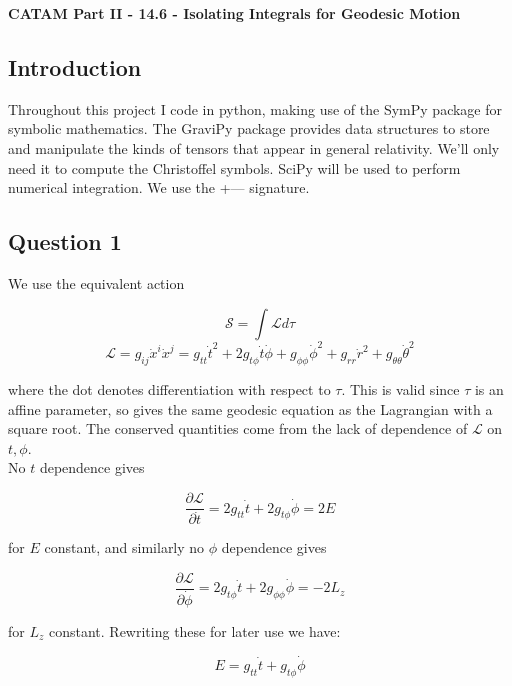 \documentclass[10pt,a4paper]{report}
\begin{document}
\textbf{CATAM Part II - 14.6 - Isolating Integrals for Geodesic Motion}

\subsection*{Introduction}

Throughout this project I code in python, making use of the SymPy package for symbolic mathematics. The GraviPy package provides data structures to store and manipulate the kinds of tensors that appear in general relativity. We'll only need it to compute the Christoffel symbols. SciPy will be used to perform numerical integration. We use the +--- signature. 
\subsection*{Question 1}

We use the equivalent action 

\begin{equation*}
\mathcal{S}=\int \mathcal{L} d\tau
\end{equation*}
\begin{equation*}
\mathcal{L}=g_{ij}\dot{x}^i\dot{x}^j = g_{tt}\dot{t}^2 + 2g_{t\phi}\dot{t}\dot{\phi}+g_{\phi\phi}\dot{\phi}^2+g_{rr}\dot{r}^2+g_{\theta\theta}\dot{\theta}^2
\end{equation*} 

where the dot denotes differentiation with respect to $\tau$. This is valid since $\tau$ is an affine parameter, so gives the same geodesic equation as the Lagrangian with a square root. The conserved quantities come from the lack of dependence of $\mathcal{L}$ on $t, \phi$.\\

No $t$ dependence gives

\begin{equation}
\frac{\partial \mathcal{L}}{\partial \dot{t}} = 2g_{tt}\dot{t} + 2g_{t\phi}\dot{\phi} = 2E
\end{equation}

for $E$ constant, and similarly no $\phi$ dependence gives 

\begin{equation}
\frac{\partial \mathcal{L}}{\partial \dot{\phi}} = 2g_{t\phi}\dot{t}+2g_{\phi\phi}\dot{\phi} = -2L_z
\end{equation}

for $L_z$ constant. Rewriting these for later use we have: 

\begin{equation}
E = g_{tt}\dot{t} + g_{t\phi}\dot{\phi}
\label{Edef}
\end{equation}
\end{document}
